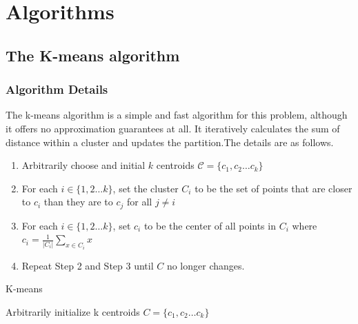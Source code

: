 \documentclass[11pt]{article}
\begin{document}
\section{Algorithms}
\subsection{The K-means algorithm}
\subsubsection{Algorithm Details}
The k-means algorithm is a simple and fast algorithm for this problem, although it offers no approximation guarantees at all.
It iteratively calculates the sum of distance within a cluster and updates the partition.The details are as follows.\cite{k-means}
\begin{enumerate}
  \item Arbitrarily choose and initial $k$ centroids $\mathcal{C} = \{c_1, c_2 \dots c_k\}$
  \item For each $i \in \{1, 2 \dots k\}$, set the cluster $C_i$ to be the set of points that are closer to $c_i$ than they are to $c_j$ for all $j \neq i$
  \item For each $i \in \{1, 2 \dots k\}$, set $c_i$ to be the center of all points in $C_i$ where $c_i = \frac{1}{\left\lvert C_i \right\rvert }\sum_{x \in C_i} x $
  \item Repeat Step 2 and Step 3 until $C$ no longer changes.
\end{enumerate}
\begin{algorithm}
  \caption{K-means}
  \label{k-means}
  \begin{algorithmic}
    \STATE Arbitrarily initialize k centroids $C=\{c_1, c_2 \dots c_k\}$ 
    \REPEAT
      \ENDFOR
      \ENDFOR
      \ENDFOR
      \ENDFOR
  \end{algorithmic}
\end{algorithm}
\end{document}
